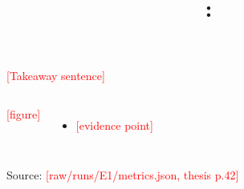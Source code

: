 \documentclass[aspectratio=169,11pt]{beamer}
\title{\fillme{Project}: \fillme{round / stage}}
\subtitle{\fillme{one-sentence headline}}
\date{\fillme{date}}
\newcommand{\fillme}[1]{\textcolor{red}{[#1]}}
\newcommand{\src}[1]{\par\vfill{\tiny\color{gray} Source: #1}}   %
\begin{document}
\maketitle


\begin{frame}{\fillme{Takeaway sentence}}
  \begin{columns}[T]
      \fillme{figure}
      \begin{itemize}
        \item \fillme{evidence point}
      \end{itemize}
  \end{columns}
  \src{\fillme{raw/runs/E1/metrics.json, thesis p.42}}
\end{frame}
\end{document}
